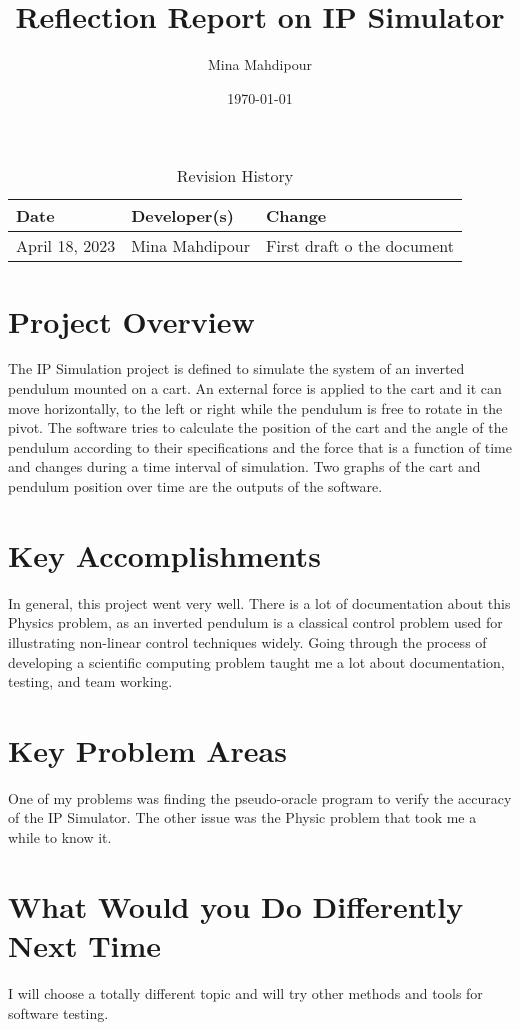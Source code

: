 \documentclass{article}
\title{Reflection Report on IP Simulator}
\author{Mina Mahdipour}
\date{\today}
\begin{document}
\newpage

\maketitle
\begin{table}[hp]
\caption{Revision History} \label{TblRevisionHistory}
\begin{tabularx}{\textwidth}{llX}
\toprule
\textbf{Date} & \textbf{Developer(s)} & \textbf{Change}\\
\midrule
April 18, 2023 & Mina Mahdipour & First draft o the document\\
\bottomrule
\end{tabularx}
\end{table}

\section{Project Overview}


The IP Simulation project is defined to simulate the system of an inverted pendulum mounted on a cart. An external force is applied to the cart and it can move horizontally, to the left or right while the pendulum is free to rotate in the pivot. The software tries to calculate the position of the cart and the angle of the pendulum according to their specifications and the force that is a function of time and changes during a time interval of simulation. Two graphs of the cart and pendulum position over time are the outputs of the software. 



\section{Key Accomplishments}

In general, this project went very well. There is a lot of documentation about this Physics problem, as an inverted pendulum is a classical control problem used for illustrating non-linear control techniques widely. Going through the process of developing a scientific computing problem taught me a lot about documentation, testing, and team working. 

\section{Key Problem Areas}
One of my problems was finding the pseudo-oracle program to verify the accuracy of the IP Simulator. The other issue was the Physic problem that took me a while to know it.

\section{What Would you Do Differently Next Time}
I will choose a totally different topic and will try other methods and tools for software testing.
\end{document}
